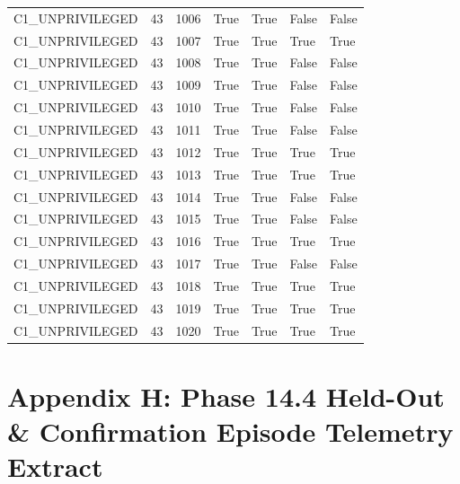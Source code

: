 \documentclass[11pt,a4paper,oneside]{book}
\begin{document}
\begin{longtable}{l l l l l l l}
C1\_UNPRIVILEGED & 43 & 1006 & True & True & False & False \\
C1\_UNPRIVILEGED & 43 & 1007 & True & True & True & True \\
C1\_UNPRIVILEGED & 43 & 1008 & True & True & False & False \\
C1\_UNPRIVILEGED & 43 & 1009 & True & True & False & False \\
C1\_UNPRIVILEGED & 43 & 1010 & True & True & False & False \\
C1\_UNPRIVILEGED & 43 & 1011 & True & True & False & False \\
C1\_UNPRIVILEGED & 43 & 1012 & True & True & True & True \\
C1\_UNPRIVILEGED & 43 & 1013 & True & True & True & True \\
C1\_UNPRIVILEGED & 43 & 1014 & True & True & False & False \\
C1\_UNPRIVILEGED & 43 & 1015 & True & True & False & False \\
C1\_UNPRIVILEGED & 43 & 1016 & True & True & True & True \\
C1\_UNPRIVILEGED & 43 & 1017 & True & True & False & False \\
C1\_UNPRIVILEGED & 43 & 1018 & True & True & True & True \\
C1\_UNPRIVILEGED & 43 & 1019 & True & True & True & True \\
C1\_UNPRIVILEGED & 43 & 1020 & True & True & True & True \\
\bottomrule \end{longtable}
\chapter{Appendix H: Phase 14.4 Held-Out \& Confirmation Episode Telemetry Extract}
\end{document}
